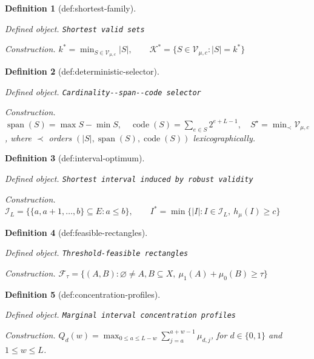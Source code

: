\documentclass{article}
\newtheorem{definition}{Definition}
\begin{document}
\begin{definition}[def:shortest-family]\label{def:shortest-family}
\par\smallskip\noindent\emph{Defined object.} \texttt{Shortest valid sets}
\par\smallskip\noindent\emph{Construction.} \(k^*=\min_{S\in\mathcal V_{\mu,c}}|S|,\qquad\mathcal K^*=\{S\in\mathcal V_{\mu,c}:|S|=k^*\}\)
\end{definition}

\begin{definition}[def:deterministic-selector]\label{def:deterministic-selector}
\par\smallskip\noindent\emph{Defined object.} \texttt{Cardinality-\allowbreak{}-\allowbreak{}span-\allowbreak{}-\allowbreak{}code selector}
\par\smallskip\noindent\emph{Construction.} \(\operatorname{span}(S)=\max S-\min S,\quad\operatorname{code}(S)=\sum_{e\in S}2^{e+L-1},\quad S^\star=\min_{\prec}\mathcal V_{\mu,c}\), where \(\prec\) orders \((|S|,\operatorname{span}(S),\operatorname{code}(S))\) lexicographically.
\end{definition}

\begin{definition}[def:interval-optimum]\label{def:interval-optimum}
\par\smallskip\noindent\emph{Defined object.} \texttt{Shortest interval induced by robust validity}
\par\smallskip\noindent\emph{Construction.} \(\mathcal I_L=\{\{a,a+1,\ldots,b\}\subseteq E:a\leq b\},\qquad I^*=\min\{|I|:I\in\mathcal I_L,\ h_{\mu}(I)\geq c\}\)
\end{definition}

\begin{definition}[def:feasible-rectangles]\label{def:feasible-rectangles}
\par\smallskip\noindent\emph{Defined object.} \texttt{Threshold-\allowbreak{}feasible rectangles}
\par\smallskip\noindent\emph{Construction.} \(\mathcal F_{\tau}=\{(A,B):\varnothing\neq A,B\subseteq X,\ \mu_1(A)+\mu_0(B)\geq\tau\}\)
\end{definition}

\begin{definition}[def:concentration-profiles]\label{def:concentration-profiles}
\par\smallskip\noindent\emph{Defined object.} \texttt{Marginal interval concentration profiles}
\par\smallskip\noindent\emph{Construction.} \(Q_d(w)=\max_{0\leq a\leq L-w}\sum_{j=a}^{a+w-1}\mu_{d,j}\), for \(d\in\{0,1\}\) and \(1\leq w\leq L\).
\end{definition}
\end{document}
